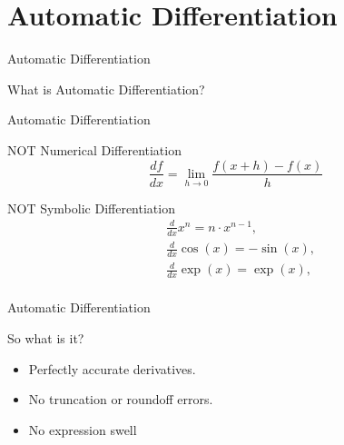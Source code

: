 \section{Automatic Differentiation}
\begin{frame}{Automatic Differentiation}
    \begin{center}
    \Huge What is Automatic Differentiation?
    \end{center}
\end{frame}
\begin{frame}{Automatic Differentiation}
    \begin{block}{NOT Numerical Differentiation}
        \begin{equation*}
            \frac{df}{dx} = \lim_{h \to 0}\frac{f(x+h) - f(x)}{h}
        \end{equation*}
    \end{block}
    \pause
    \begin{block}{NOT Symbolic Differentiation}
        \begin{align*}
            &\frac{d}{dx}x^n     = n\cdot x^{n-1}, \\
            &\frac{d}{dx}\cos(x)  = -\sin(x), \\
            &\frac{d}{dx}\exp(x) = \exp(x), \\
        \end{align*}
    \end{block}
\end{frame}
\begin{frame}{Automatic Differentiation}
    \begin{block}{So what is it?}
        \begin{itemize}
            \item Perfectly accurate derivatives.
            \item No truncation or roundoff errors.
            \item No expression swell
        \end{itemize}
    \end{block}
\end{frame}

